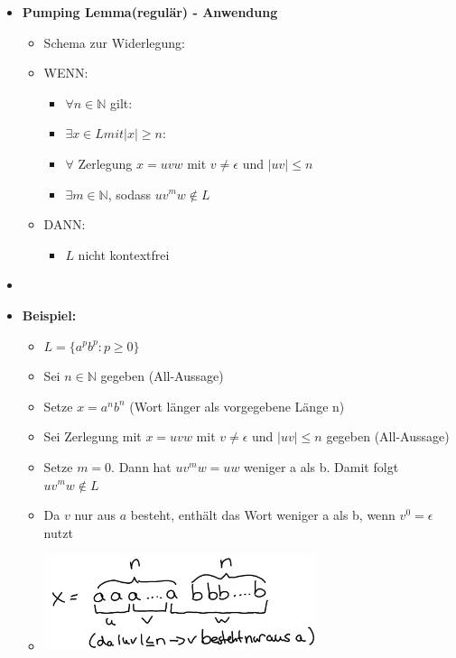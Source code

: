 \documentclass[11pt,a4paper]{article}
\begin{document}
\begin{itemize}
\item {\large \textbf{Pumping Lemma(regulär) - Anwendung}}
	\begin{itemize}
	\item Schema zur Widerlegung:
	\item WENN: 
		\begin{itemize}
		\item $\forall n \in \mathbb{N}$ gilt:
		\item $\exists x \in L mit |x| \geq n$:
		\item $\forall$ Zerlegung $x=uvw$ mit $v \neq \epsilon$ und $|uv| \leq n$
		\item $\exists m \in \mathbb{N}$, sodass $uv^mw \notin L$
		\end{itemize}
	\item DANN: 
		\begin{itemize}
		\item $L$ nicht kontextfrei
		\end{itemize}
	\end{itemize}
	\item[]
	\item \textbf{Beispiel:}
		\begin{itemize}
		\item $L=\{a^pb^p : p \geq 0 \}$
		\item Sei $n \in \mathbb{N}$ gegeben (All-Aussage)
		\item Setze $x = a^nb^n$ (Wort länger als vorgegebene Länge n)
		\item Sei Zerlegung mit $x=uvw$ mit $v \neq \epsilon$ und $|uv| \leq n$ gegeben (All-Aussage)
		\item Setze $m = 0$. Dann hat $uv^mw = uw$ weniger a als b. Damit folgt $uv^mw \notin L$ 
		\item Da $v$ nur aus $a$ besteht, enthält das Wort weniger a als b, wenn $v^0 = \epsilon$ nutzt
		\item[]
			\begin{center}
			\includegraphics[width=8cm]{Bilder/pump1}
			\end{center}
		\end{itemize}	



\end{itemize}
\end{document}
